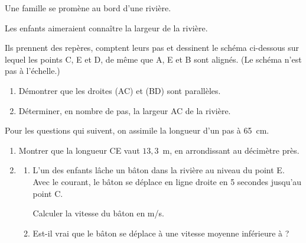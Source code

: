 \documentclass[exercice,a4]{thedocument}%
\begin{document}
%

Une famille se promène au bord d’une rivière.

Les enfants aimeraient connaître la largeur de la rivière.

Ils prennent des repères, comptent leurs pas et dessinent le schéma ci-dessous sur lequel les points C, E et D, de même que A, E et B sont alignés. (Le schéma n'est pas à l’échelle.)

\begin{center}
\end{center}

\begin{enumerate}
\item Démontrer que les droites (AC) et (BD) sont parallèles.
\item Déterminer, en nombre de pas, la largeur AC de la rivière.
\end{enumerate}

 Pour les questions qui suivent, on assimile la longueur d'un pas à 65~cm.

\medskip

\begin{enumerate}[resume]
\item Montrer que la longueur CE vaut $13,3$~m, en arrondissant au décimètre près.
\item
	\begin{enumerate}
		\item  L’un des enfants lâche un bâton dans la rivière au niveau du point E. Avec le courant, le bâton se déplace en ligne droite en 5 secondes jusqu'au point C.

Calculer la vitesse du bâton en m/s.
	\item Est-il vrai que \og le bâton se déplace à une vitesse moyenne inférieure à \fg?
	\end{enumerate}
\end{enumerate}

\bigskip

\showthesource
\end{document}
